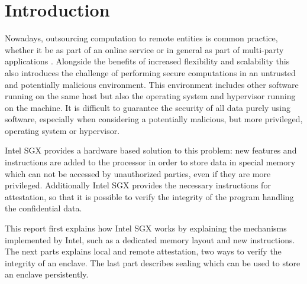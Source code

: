 \section{Introduction} \label{sec:introduction}
Nowadays, outsourcing computation to remote entities is common practice, whether it be as part of an online service or 
in general as part of multi-party applications \cite{UseOfIntelSGX}. 
Alongside the benefits of increased flexibility and scalability this also introduces the challenge of performing secure 
computations in an untrusted and potentially malicious environment. 
This environment includes other software running on the same host but also the operating system and hypervisor running
on the machine.
It is difficult to guarantee the security of all data purely using software, especially when considering a potentially 
malicious, but more privileged, operating system or hypervisor.

Intel SGX provides a hardware based solution to this problem: new features and instructions are added to the processor
in order to store data in special memory which can not be accessed by unauthorized parties, even if they are more
privileged. Additionally Intel SGX provides the necessary instructions for attestation, so that it is possible to
verify the integrity of the program handling the confidential data.

This report first explains how Intel SGX works by explaining the mechanisms implemented by Intel, such as a
dedicated memory layout and new instructions. The next parts explains local and remote attestation, two ways to
verify the integrity of an enclave. The last part describes sealing which can be used to store an enclave persistently.
